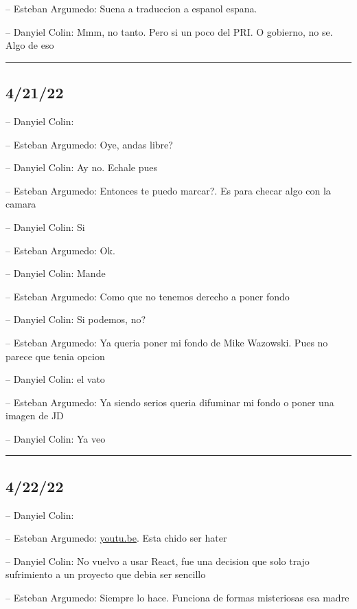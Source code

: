 -- Esteban Argumedo: Suena a traduccion a espanol espana.

-- Danyiel Colin: Mmm, no tanto. Pero si un poco del PRI. O gobierno, no
se. Algo de eso

\begin{center}\rule{0.5\linewidth}{0.5pt}\end{center}

\hypertarget{section-59}{%
\subsection{4/21/22}\label{section-59}}

-- Danyiel Colin:

-- Esteban Argumedo: Oye, andas libre?

-- Danyiel Colin: Ay no. Echale pues

-- Esteban Argumedo: Entonces te puedo marcar?. Es para checar algo con
la camara

-- Danyiel Colin: Si

-- Esteban Argumedo: Ok.

-- Danyiel Colin: Mande

-- Esteban Argumedo: Como que no tenemos derecho a poner fondo

-- Danyiel Colin: Si podemos, no?

-- Esteban Argumedo: Ya queria poner mi fondo de Mike Wazowski. Pues no
parece que tenia opcion

-- Danyiel Colin: el vato

-- Esteban Argumedo: Ya siendo serios queria difuminar mi fondo o poner
una imagen de JD

-- Danyiel Colin: Ya veo

\begin{center}\rule{0.5\linewidth}{0.5pt}\end{center}

\hypertarget{section-60}{%
\subsection{4/22/22}\label{section-60}}

-- Danyiel Colin:

-- Esteban Argumedo: \href{https://youtu.be/HyWYpM_S-2c}{youtu.be}. Esta
chido ser hater

-- Danyiel Colin: No vuelvo a usar React, fue una decision que solo
trajo sufrimiento a un proyecto que debia ser sencillo

-- Esteban Argumedo: Siempre lo hace. Funciona de formas misteriosas esa
madre

